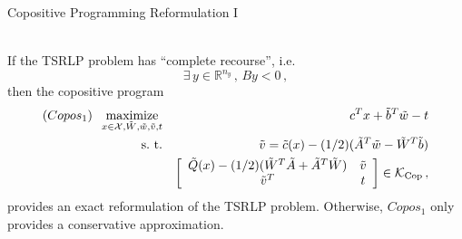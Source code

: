 \documentclass[xcolor=x11names,compress]{beamer}
\renewcommand{\(}{\begin{columns}}
\renewcommand{\)}{\end{columns}}
\newcommand{\<}[1]{\begin{column}{#1}}
\renewcommand{\>}{\end{column}}
\def\maximize{\mathop{\rm maximize}}
\def\subto{{\rm s. \mbox{ }\rm t.}}
\newcommand{\0}{\V{0}}
\newcommand{\1}{\V{1}}
\newcommand{\mymbox}[1]{\mbox{\scriptsize #1}}
\renewcommand{\Re}{\mathbb{R}}
\newcommand{\quoteIt}[1]{``#1''}
\newcommand{\tQ}{\tilde{Q}(x)}
\newcommand{\tq}{\tilde{c}(x)}
\newcommand{\tA}{\tilde{A}}
\newcommand{\tb}{\tilde{b}}
\newcommand{\tw}{\tilde{w}}
\newcommand{\tv}{\tilde{v}}
\newcommand{\tW}{\tilde{W}}
\newcommand{\copconeCopos}{\mathcal{K}_{\mymbox{Cop}}}
\begin{document}
\begin{frame}{Copositive Programming Reformulation I}

\begin{theorem}
\vspace{-0.5cm}\hspace{2.5cm}{\footnotesize [Xu \& Burer (2016), Hanasusanto \& Kuhn (2016)]}\\
 If the TSRLP problem has \quoteIt{complete recourse}, i.e.
 \[ \exists\, y\in\Re^{n_y}\,,\,By<0\,,\]
then the copositive program
\begin{eqnarray*}
(Copos_1)\;\;\maximize_{x\in\mathcal{X},\tW,\tw,\tv,t} && c^T x+ \tb^T\tw - t\\
\subto && \tv = \tq - (1/2)(\tA^T\tw-\tW^T\tb)\\
&&\left[\begin{array}{cc} \tQ - (1/2)(\tW^T \tA + \tA^T\tW) & \tv\\ \tv^T & t\end{array}\right]\in \copconeCopos\,,
\end{eqnarray*}
provides an exact reformulation of the TSRLP problem.
Otherwise, $Copos_1$ only provides a conservative approximation.
\end{theorem}

\end{frame}

\end{document}
